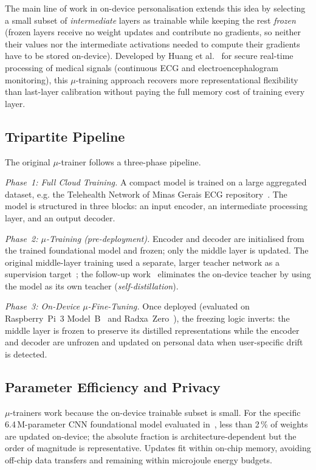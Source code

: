 \documentclass[conference]{IEEEtran}
\begin{document}
The main line of work in on-device personalisation extends
this idea by selecting a small subset of \emph{intermediate}
layers as trainable while keeping the rest \emph{frozen} (frozen
layers receive no weight updates and contribute no gradients,
so neither their values nor the intermediate activations needed
to compute their gradients have to be stored on-device). Developed
by Huang et al.~\cite{b3,b13} for secure real-time processing of
medical signals (continuous ECG and electroencephalogram
monitoring), this $\mu$-training approach recovers more
representational flexibility than last-layer calibration without
paying the full memory cost of training every layer.

\subsection{Tripartite Pipeline}

The original $\mu$-trainer follows a three-phase pipeline.

\textit{Phase~1: Full Cloud Training.} A compact model is trained
on a large aggregated dataset, e.g. the Telehealth Network of
Minas Gerais ECG repository~\cite{b3}. The model is structured in
three blocks: an input encoder, an intermediate processing layer,
and an output decoder.

\textit{Phase~2: $\mu$-Training (pre-deployment).} Encoder and
decoder are initialised from the trained foundational model and
frozen; only the middle layer is updated. The original middle-layer
training used a separate, larger teacher network as a supervision
target~\cite{b3}; the follow-up work~\cite{b13} eliminates the
on-device teacher by using the model as its own teacher
(\emph{self-distillation}).

\textit{Phase~3: On-Device $\mu$-Fine-Tuning.} Once deployed
(evaluated on Raspberry~Pi~3 Model~B~\cite{b3} and
Radxa~Zero~\cite{b13}), the freezing logic inverts: the middle
layer is frozen to preserve its distilled representations while
the encoder and decoder are unfrozen and updated on personal data
when user-specific drift is detected.

\subsection{Parameter Efficiency and Privacy}

$\mu$-trainers work because the on-device trainable subset is
small. For the specific 6.4\,M-parameter CNN
foundational model evaluated in~\cite{b3}, less than 2\,\% of
weights are updated on-device; the absolute fraction is
architecture-dependent but the order of magnitude is
representative. Updates fit within on-chip memory, avoiding
off-chip data transfers and remaining within microjoule energy
budgets.
\end{document}
